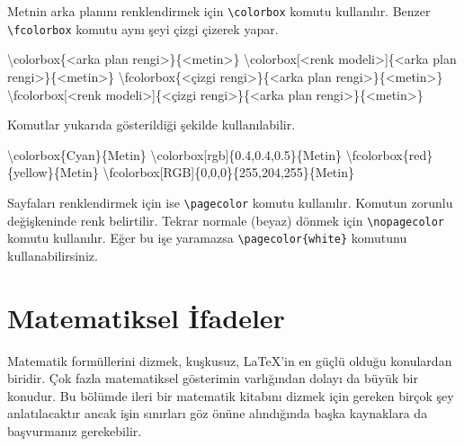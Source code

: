 \documentclass[
  10pt,
]{scrbook}
\newenvironment{Shaded}{\begin{snugshade}}{\end{snugshade}}
\newcommand{\FunctionTok}[1]{\textcolor[rgb]{0.00,0.00,0.00}{#1}}
\newcommand{\NormalTok}[1]{#1}
\theoremstyle{definition}
\theoremstyle{definition}
\theoremstyle{definition}
\theoremstyle{definition}
\theoremstyle{remark}
\begin{document}
Metnin arka planını renklendirmek için \texttt{\textbackslash{}colorbox} komutu kullanılır. Benzer \texttt{\textbackslash{}fcolorbox} komutu aynı şeyi çizgi çizerek yapar.

\begin{Shaded}
\begin{Highlighting}[]
\FunctionTok{\textbackslash{}colorbox}\NormalTok{\{\textless{}arka plan rengi\textgreater{}\}\{\textless{}metin\textgreater{}\}}
\FunctionTok{\textbackslash{}colorbox}\NormalTok{[\textless{}renk modeli\textgreater{}]\{\textless{}arka plan rengi\textgreater{}\}\{\textless{}metin\textgreater{}\}}
\FunctionTok{\textbackslash{}fcolorbox}\NormalTok{\{\textless{}çizgi rengi\textgreater{}\}\{\textless{}arka plan rengi\textgreater{}\}\{\textless{}metin\textgreater{}\}}
\FunctionTok{\textbackslash{}fcolorbox}\NormalTok{[\textless{}renk modeli\textgreater{}]\{\textless{}çizgi rengi\textgreater{}\}\{\textless{}arka plan rengi\textgreater{}\}\{\textless{}metin\textgreater{}\}}
\end{Highlighting}
\end{Shaded}

Komutlar yukarıda gösterildiği şekilde kullanılabilir.

\begin{Shaded}
\begin{Highlighting}[]
\FunctionTok{\textbackslash{}colorbox}\NormalTok{\{Cyan\}\{Metin\}}
\FunctionTok{\textbackslash{}colorbox}\NormalTok{[rgb]\{0.4,0.4,0.5\}\{Metin\}}
\FunctionTok{\textbackslash{}fcolorbox}\NormalTok{\{red\}\{yellow\}\{Metin\}}
\FunctionTok{\textbackslash{}fcolorbox}\NormalTok{[RGB]\{0,0,0\}\{255,204,255\}\{Metin\}}
\end{Highlighting}
\end{Shaded}

Sayfaları renklendirmek için ise \texttt{\textbackslash{}pagecolor} komutu kullanılır. Komutun zorunlu değişkeninde renk belirtilir. Tekrar normale (beyaz) dönmek için \texttt{\textbackslash{}nopagecolor} komutu kullanılır. Eğer bu işe yaramazsa \texttt{\textbackslash{}pagecolor\{white\}} komutunu kullanabilirsiniz.

\hypertarget{matematiksel-ifadeler}{%
\chapter{Matematiksel İfadeler}\label{matematiksel-ifadeler}}

Matematik formüllerini dizmek, kuşkusuz, LaTeX'in en güçlü olduğu konulardan biridir. Çok fazla matematiksel gösterimin varlığından dolayı da büyük bir konudur. Bu bölümde ileri bir matematik kitabını dizmek için gereken birçok şey anlatılacaktır ancak işin sınırları göz önüne alındığında başka kaynaklara da başvurmanız gerekebilir.
\end{document}
